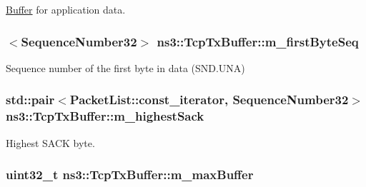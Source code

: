 \hyperlink{classns3_1_1Buffer}{Buffer} for application data. 

\subsubsection[{\texorpdfstring{m\+\_\+first\+Byte\+Seq}{m_firstByteSeq}}]{$<${\bf Sequence\+Number32}$>$ ns3\+::\+Tcp\+Tx\+Buffer\+::m\+\_\+first\+Byte\+Seq\hspace{0.3cm}{\ttfamily [private]}}\hypertarget{classns3_1_1TcpTxBuffer_a46b67e5cb3396b43a41dd3fd5b135346}{}\label{classns3_1_1TcpTxBuffer_a46b67e5cb3396b43a41dd3fd5b135346}


Sequence number of the first byte in data (S\+N\+D.\+U\+NA) 

\subsubsection[{\texorpdfstring{m\+\_\+highest\+Sack}{m_highestSack}}]{\setlength{\rightskip}{0pt plus 5cm}std\+::pair$<$Packet\+List\+::const\+\_\+iterator, {\bf Sequence\+Number32}$>$ ns3\+::\+Tcp\+Tx\+Buffer\+::m\+\_\+highest\+Sack\hspace{0.3cm}{\ttfamily [private]}}\hypertarget{classns3_1_1TcpTxBuffer_a224ded405afbf30d8828c8ddd16b29d9}{}\label{classns3_1_1TcpTxBuffer_a224ded405afbf30d8828c8ddd16b29d9}


Highest S\+A\+CK byte. 

\subsubsection[{\texorpdfstring{m\+\_\+max\+Buffer}{m_maxBuffer}}]{\setlength{\rightskip}{0pt plus 5cm}uint32\+\_\+t ns3\+::\+Tcp\+Tx\+Buffer\+::m\+\_\+max\+Buffer\hspace{0.3cm}{\ttfamily [private]}}\hypertarget{classns3_1_1TcpTxBuffer_a4e661fb54fabfe319c6fc15f7080526f}{}\label{classns3_1_1TcpTxBuffer_a4e661fb54fabfe319c6fc15f7080526f}


